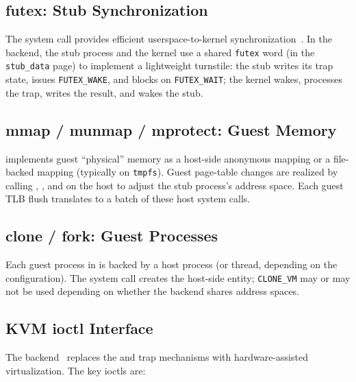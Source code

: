 \subsection{futex: Stub Synchronization}

The  system call provides efficient userspace-to-kernel
synchronization~\cite{futex-lwn}.  In the \Seccomp{} backend, the
stub process and the \UML{} kernel use a shared \texttt{futex} word
(in the \texttt{stub\_data} page) to implement a lightweight turnstile:
the stub writes its trap state, issues \texttt{FUTEX\_WAKE}, and blocks
on \texttt{FUTEX\_WAIT}; the \UML{} kernel wakes, processes the trap,
writes the result, and wakes the stub.

\subsection{mmap / munmap / mprotect: Guest Memory}

\UML{} implements guest ``physical'' memory as a host-side anonymous
mapping or a file-backed mapping (typically on \texttt{tmpfs}).  Guest
page-table changes are realized by calling ,
, and  on the host to adjust the
stub process's address space.  Each guest TLB flush translates to a
batch of these host system calls.

\subsection{clone / fork: Guest Processes}

Each guest process in \UML{} is backed by a host process (or thread,
depending on the configuration).  The  system call
creates the host-side entity; \texttt{CLONE\_VM} may or may not be
used depending on whether the backend shares address spaces.

\subsection{KVM ioctl Interface}
\label{sec:foundations:kvm-api}

The \KVM{} backend~\cite{kvm-api} replaces the  and
\Seccomp{} trap mechanisms with hardware-assisted virtualization.  The
key ioctls are:

